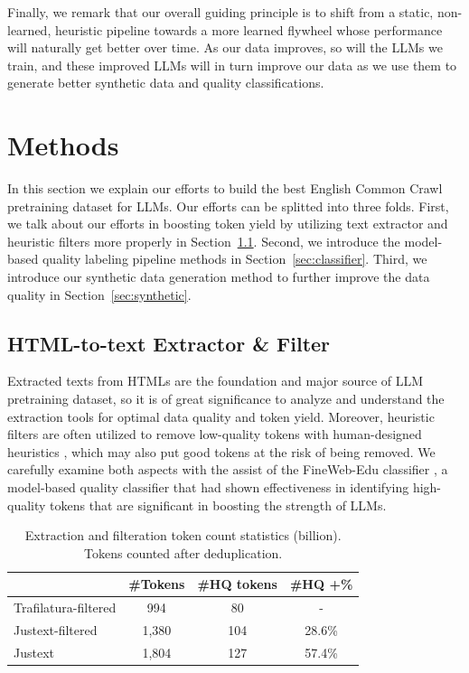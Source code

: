 \documentclass[11pt]{article}
\begin{document}
Finally, we remark that our overall guiding principle is to shift from a static, non-learned, heuristic pipeline towards a more learned flywheel whose performance will naturally get better over time. As our data improves, so will the LLMs we train, and these improved LLMs will in turn improve our data as we use them to generate better synthetic data and quality classifications.

\section{Methods}

In this section we explain our efforts to build the best English Common Crawl pretraining dataset for LLMs. Our efforts can be splitted into three folds. First, we talk about our efforts in boosting token yield by utilizing text extractor and heuristic filters more properly in Section~\ref{sec:extract_filter}. Second, we introduce the model-based quality labeling pipeline methods in Section~\ref{sec:classifier}. Third, we introduce our synthetic data generation method to further improve the data quality in Section~\ref{sec:synthetic}.

\subsection{HTML-to-text Extractor \& Filter} \label{sec:extract_filter}
Extracted texts from HTMLs are the foundation and major source of LLM pretraining dataset, so it is of great significance to analyze and understand the extraction tools for optimal data quality and token yield. Moreover, heuristic filters are often utilized to remove low-quality tokens with human-designed heuristics \citep{li2024datacomp,parmar2024data,penedo2024fineweb,dubey2024llama}, which may also put good tokens at the risk of being removed. We carefully examine both aspects with the assist of the FineWeb-Edu classifier \citep{penedo2024fineweb}, a model-based quality classifier that had shown effectiveness in identifying high-quality tokens that are significant in boosting the strength of LLMs.

\begin{table}[htbp] \small \centering
\begin{tabular}{@{}lccc@{}}
\toprule  
                     & \textbf{\#Tokens} & \textbf{\#HQ tokens} & \textbf{\#HQ +\%} \\ \midrule
Trafilatura-filtered & 994              & 80                  & -                       \\
Justext-filtered     & 1,380            & 104                 & 28.6\%                  \\
Justext              & 1,804            & 127                 & 57.4\%                  \\ \bottomrule
\end{tabular}
\caption{Extraction and filteration token count statistics (billion). Tokens counted after deduplication.}
\label{table:extract_filter_stats}
\end{table}
\end{document}
